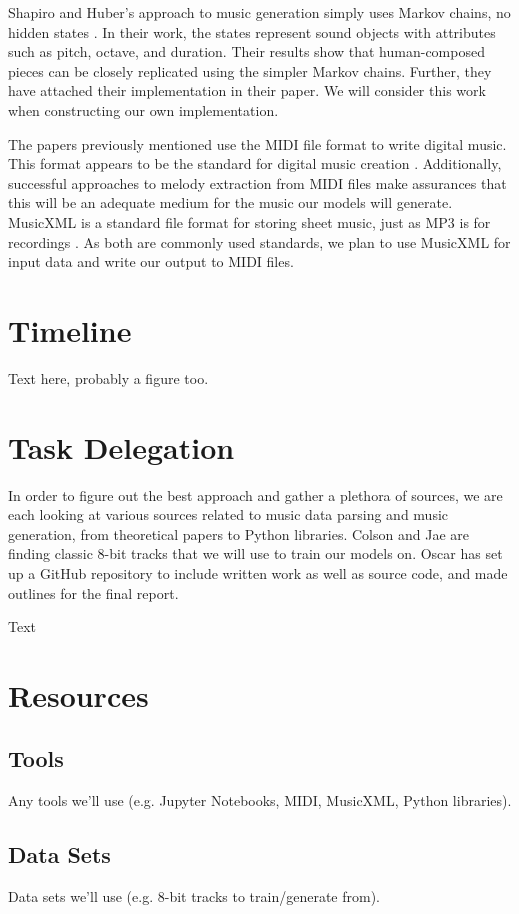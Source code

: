 \documentclass{article}
\begin{document}
Shapiro and Huber's approach to music generation simply uses Markov chains, no hidden states \cite{shapiro_huber_2021}. In their work, the states represent sound 
objects with attributes such as pitch, octave, and duration. Their results show that human-composed pieces can be closely replicated using the simpler Markov chains. 
Further, they have attached their implementation in their paper. We will consider this work when constructing our own implementation.

The papers previously mentioned use the MIDI file format to write digital music. This format appears to be the standard for digital music creation \cite{midi_format}. 
Additionally, successful approaches to melody extraction from MIDI files \cite{ozcan_2005} make assurances that this will be an adequate medium for the music our models 
will generate. MusicXML is a standard file format for storing sheet music, just as MP3 is for recordings \cite{musicxml_2022}. As both are commonly used standards, we 
plan to use MusicXML for input data and write our output to MIDI files.

\section{Timeline}
Text here, probably a figure too. 

\section{Task Delegation}
In order to figure out the best approach and gather a plethora of sources, we are each looking at various sources related to music data parsing and music generation, 
from theoretical papers to Python libraries. Colson and Jae are finding classic 8-bit tracks that we will use to train our models on. Oscar has set up a GitHub repository 
to include written work as well as source code, and made outlines for the final report. 

Text

\section{Resources}

\subsection{Tools}
Any tools we'll use (e.g. Jupyter Notebooks, MIDI, MusicXML, Python libraries).

\subsection{Data Sets}
Data sets we'll use (e.g. 8-bit tracks to train/generate from).



\end{document}
